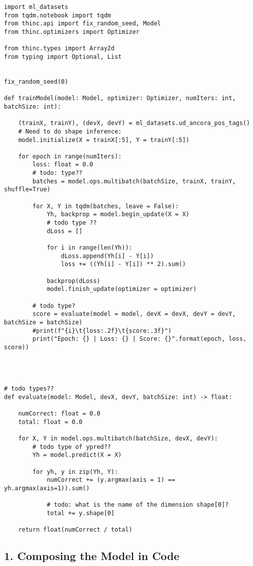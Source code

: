 \documentclass[
]{article}
\begin{document}
\begin{verbatim}
import ml_datasets
from tqdm.notebook import tqdm
from thinc.api import fix_random_seed, Model
from thinc.optimizers import Optimizer

from thinc.types import Array2d
from typing import Optional, List


fix_random_seed(0)

def trainModel(model: Model, optimizer: Optimizer, numIters: int, batchSize: int):

    (trainX, trainY), (devX, devY) = ml_datasets.ud_ancora_pos_tags()
    # Need to do shape inference:
    model.initialize(X = trainX[:5], Y = trainY[:5])

    for epoch in range(numIters):
        loss: float = 0.0
        # todo: type??
        batches = model.ops.multibatch(batchSize, trainX, trainY, shuffle=True)

        for X, Y in tqdm(batches, leave = False):
            Yh, backprop = model.begin_update(X = X)
            # todo type ??
            dLoss = []

            for i in range(len(Yh)):
                dLoss.append(Yh[i] - Y[i])
                loss += ((Yh[i] - Y[i]) ** 2).sum()

            backprop(dLoss)
            model.finish_update(optimizer = optimizer)

        # todo type?
        score = evaluate(model = model, devX = devX, devY = devY, batchSize = batchSize)
        #print(f"{i}\t{loss:.2f}\t{score:.3f}")
        print("Epoch: {} | Loss: {} | Score: {}".format(epoch, loss, score))




# todo types??
def evaluate(model: Model, devX, devY, batchSize: int) -> float:

    numCorrect: float = 0.0
    total: float = 0.0

    for X, Y in model.ops.multibatch(batchSize, devX, devY):
        # todo type of ypred??
        Yh = model.predict(X = X)

        for yh, y in zip(Yh, Y):
            numCorrect += (y.argmax(axis = 1) == yh.argmax(axis=1)).sum()

            # todo: what is the name of the dimension shape[0]?
            total += y.shape[0]

    return float(numCorrect / total)
\end{verbatim}

\hypertarget{composing-the-model-in-code}{%
\subsection{1. Composing the Model in
Code}\label{composing-the-model-in-code}}
\end{document}
